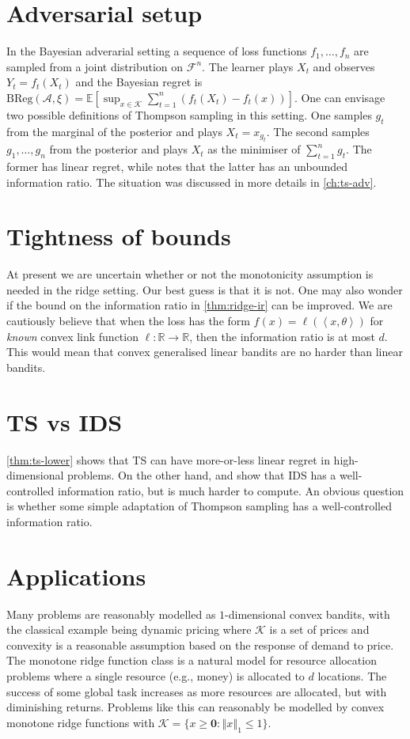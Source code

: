 \documentclass[letter, 12pt]{report}
\newcommand{\R}{\mathbb R}
\newcommand{\ip}[1]{\left \langle #1 \right \rangle}
\newcommand{\BReg}{\textrm{BReg}}
\newcommand{\norm}[1]{\left \Vert  #1 \right \Vert}
\newcommand{\E}{\mathbb E}
\newcommand{\cK}{\mathcal K}
\newcommand{\sF}{\mathscr F}
\newcommand{\sA}{\mathscr A}
\newcommand{\zeros}{ \bm 0}
\newcommand{\1}{\mathbf{1}}
\newcommand{\ts}{\textsc{TS}\xspace}
\newcommand{\IDS}{\textsc{IDS}}
\theoremstyle{plain}
\theoremstyle{definition}
\theoremstyle{remark}
\begin{document}
\section{Adversarial setup} In the Bayesian adverarial setting a sequence of loss functions $f_1,\ldots,f_n$ are sampled from a joint distribution on $\sF^n$.
The learner plays $X_t$ and observes $Y_t = f_t(X_t)$ and the Bayesian regret is
$\BReg(\sA, \xi) = \E[\sup_{x \in \cK} \sum_{t=1}^n (f_t(X_t) - f_t(x))]$.
One can envisage two possible definitions of Thompson sampling in this setting. One samples $g_t$ from the marginal of the posterior and plays $X_t = x_{g_t}$.
The second samples $g_1,\ldots,g_n$ from the posterior and plays $X_t$ as the minimiser of $\sum_{t=1}^n g_t$.
The former has linear regret, while \cite{BDKP15} notes
that the latter has an unbounded information ratio. The situation was discussed in more details in \cref{ch:ts-adv}.
\section{Tightness of bounds} At present we are uncertain whether or not the monotonicity assumption is needed in the ridge setting. Our best guess is that it is not.
One may also wonder if the bound on the information ratio in \cref{thm:ridge-ir} can be improved. We are cautiously believe
that when the loss has the form $f(x) = \ell(\ip{x, \theta})$ for \textit{known} convex link function $\ell : \R \to \R$, then the information ratio is at most $d$.
This would mean that convex generalised linear bandits are no harder than linear bandits.

\section{\ts{} vs \IDS} \cref{thm:ts-lower} shows that \ts{} can have more-or-less linear regret in high-dimensional problems. On the other hand,
\cite{BE18} and \cite{Lat20-cvx} show that \IDS{} has a well-controlled information ratio, but is much harder to compute.
An obvious question is whether some simple adaptation of Thompson sampling has a well-controlled information ratio.
\section{Applications} Many problems are reasonably modelled as $1$-dimensional convex bandits, with the classical example being dynamic pricing
where $\cK$ is a set of prices and convexity is a reasonable assumption based on the response of demand to price.
The monotone ridge function class is a natural model for resource allocation problems where a single resource (e.g., money) is allocated to $d$ locations.
The success of some global task increases as more resources are allocated, but with diminishing returns. Problems like this can reasonably be modelled
by convex monotone ridge functions with $\cK = \{x \geq \zeros : \norm{x}_1 \leq 1\}$.
\end{document}
